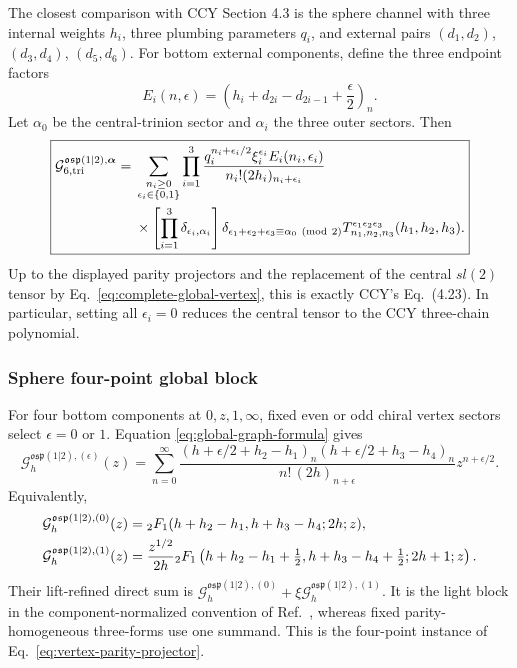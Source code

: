 \documentclass[11pt]{article}
\newcommand{\osp}{\mathfrak{osp}(1|2)}
\newcommand{\G}{\mathcal G}
\newcommand{\half}{\tfrac12}
\begin{document}
The closest comparison with CCY Section 4.3 is the sphere channel with
three internal weights \(h_i\), three plumbing parameters \(q_i\), and
external pairs \((d_1,d_2)\), \((d_3,d_4)\), \((d_5,d_6)\).  For bottom
external components, define the three endpoint factors
\begin{equation}
 E_i(n,\epsilon)
 =\left(h_i+d_{2i}-d_{2i-1}+\frac\epsilon2\right)_n.
 \label{eq:trifundamental-endpoint}
\end{equation}
Let \(\alpha_0\) be the central-trinion sector and \(\alpha_i\) the three
outer sectors.  Then
\begin{equation}
\boxed{
\begin{aligned}
 \G_{6,\rm tri}^{\osp,\bm\alpha}
 ={}&\sum_{\substack{n_i\ge0\\\epsilon_i\in\{0,1\}}}
 \prod_{i=1}^{3}
 \frac{q_i^{n_i+\epsilon_i/2}\xi_i^{\epsilon_i}
       E_i(n_i,\epsilon_i)}
      {n_i!(2h_i)_{n_i+\epsilon_i}}
 \\
 &\times
 \left[\prod_{i=1}^{3}\delta_{\epsilon_i,\alpha_i}\right]
 \delta_{\epsilon_1+\epsilon_2+\epsilon_3
             \equiv\alpha_0\ ({\rm mod}\ 2)}
 T_{n_1,n_2,n_3}^{\epsilon_1\epsilon_2\epsilon_3}
 (h_1,h_2,h_3).
\end{aligned}}
\label{eq:ns-trifundamental-global}
\end{equation}
Up to the displayed parity projectors and the replacement of the central
\(sl(2)\) tensor by Eq.~\eqref{eq:complete-global-vertex}, this is exactly
CCY's Eq.~(4.23).  In particular, setting all \(\epsilon_i=0\) reduces the
central tensor to the CCY three-chain polynomial.

\subsubsection{Sphere four-point global block}

For four bottom components at \(0,z,1,\infty\), fixed even or odd chiral
vertex sectors select \(\epsilon=0\) or \(1\).  Equation
\eqref{eq:global-graph-formula} gives
\begin{equation}
 \G_h^{\osp,(\epsilon)}(z)
 =\sum_{n=0}^{\infty}
 \frac{
  (h+\epsilon/2+h_2-h_1)_n
  (h+\epsilon/2+h_3-h_4)_n}
 {n!\,(2h)_{n+\epsilon}}
 z^{n+\epsilon/2}.
 \label{eq:sphere-global-series}
\end{equation}
Equivalently,
\begin{align}
 \G_h^{\osp,(0)}(z)
 &={}_2F_1(h+h_2-h_1,h+h_3-h_4;2h;z),
 \notag\\
 \G_h^{\osp,(1)}(z)
 &=\frac{z^{1/2}}{2h}
 {}_2F_1\left(h+h_2-h_1+\half,
               h+h_3-h_4+\half;
               2h+1;z\right).
 \label{eq:sphere-global-hypergeometric}
\end{align}
Their lift-refined direct sum is
\(\G_h^{\osp,(0)}+\xi\G_h^{\osp,(1)}\).  It is the light block in the
component-normalized convention of Ref.~\cite{BelavinGeiko2018CRecursion},
whereas fixed parity-homogeneous three-forms use one summand.  This is the
four-point instance of Eq.~\eqref{eq:vertex-parity-projector}.
\end{document}
